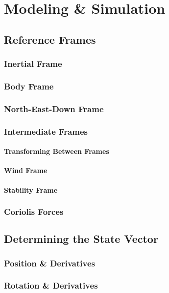 \documentclass[../notes.tex]{subfiles}
\begin{document}
\section{Modeling \& Simulation}
\subsection{Reference Frames}
\subsubsection{Inertial Frame}
\subsubsection{Body Frame}
\subsubsection{North-East-Down Frame}
\subsubsection{Intermediate Frames}
\paragraph{Transforming Between Frames}
\paragraph{Wind Frame}
\paragraph{Stability Frame}
\subsubsection{Coriolis Forces} \label{sec:coriolis}

\subsection{Determining the State Vector}
\subsubsection{Position \& Derivatives}
\subsubsection{Rotation \& Derivatives}
\end{document}
